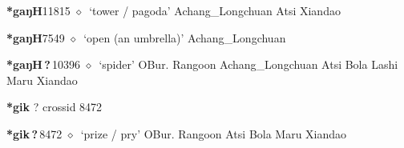   \begin{list}{}{\leftmargin=1.5em \itemindent=-1.5em}
  \item {\footnotesize \textbf{*gaŋH}}{\tiny 11815}
         $\diamond$~`tower / pagoda'
         Achang\_Longchuan 
\hspace{1ex}
         Atsi 
\hspace{1ex}
         Xiandao 
  \item {\footnotesize \textbf{*gaŋH}}{\tiny 7549}
\hspace{1ex}
         $\diamond$~`open (an umbrella)'
         Achang\_Longchuan 
  \item {\footnotesize \textbf{*gaŋH\,?\,}}{\tiny 10396}
\hspace{1ex}
         $\diamond$~`spider'
         OBur. 
\hspace{1ex}
         Rangoon 
\hspace{1ex}
         Achang\_Longchuan 
\hspace{1ex}
         Atsi 
\hspace{1ex}
         Bola 
\hspace{1ex}
         Lashi 
\hspace{1ex}
         Maru 
\hspace{1ex}
         Xiandao 
  \end{list}
\item
\textbf{*gik}
?
  {\tiny crossid 8472}
  \begin{list}{}{\leftmargin=1.5em \itemindent=-1.5em}
  \item {\footnotesize \textbf{*gik\,?\,}}{\tiny 8472}
         $\diamond$~`prize / pry'
         OBur. 
\hspace{1ex}
         Rangoon 
\hspace{1ex}
         Atsi 
\hspace{1ex}
         Bola 
\hspace{1ex}
         Maru 
\hspace{1ex}
         Xiandao 
  \end{list}
